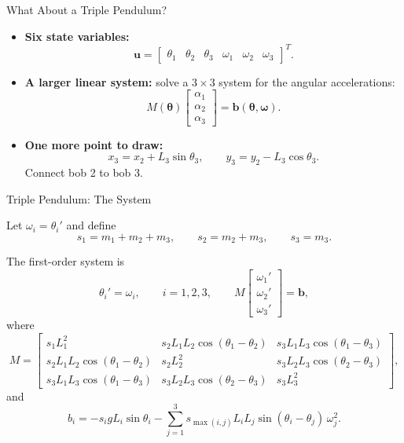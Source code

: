 \documentclass[10pt]{beamer}
\begin{document}
\begin{frame}{What About a Triple Pendulum?}


\begin{itemize}
    \item \textbf{Six state variables:}
    \[
    \mathbf{u}=
    \begin{bmatrix}
    \theta_1 & \theta_2 & \theta_3 &
    \omega_1 & \omega_2 & \omega_3
    \end{bmatrix}^{T}.
    \]

    \item \textbf{A larger linear system:}
    solve a $3\times3$ system for the angular accelerations:
    \[
    M(\boldsymbol{\theta})
    \begin{bmatrix}
    \alpha_1\\ \alpha_2\\ \alpha_3
    \end{bmatrix}
    =\mathbf{b}(\boldsymbol{\theta},\boldsymbol{\omega}).
    \]

    \item \textbf{One more point to draw:}
    \[
    x_3=x_2+L_3\sin\theta_3,
    \qquad
    y_3=y_2-L_3\cos\theta_3.
    \]
    Connect bob 2 to bob 3.
\end{itemize}


\end{frame}

\begin{frame}{Triple Pendulum: The System}

Let $\omega_i=\theta_i'$ and define
\[
s_1=m_1+m_2+m_3,\qquad s_2=m_2+m_3,\qquad s_3=m_3.
\]

The first-order system is
\[
\theta_i'=\omega_i,\qquad i=1,2,3,
\qquad
M
\begin{bmatrix}
\omega_1'\\ \omega_2'\\ \omega_3'
\end{bmatrix}
=\mathbf{b},
\]
where
{\small
\[
M=
\begin{bmatrix}
s_1L_1^2
& s_2L_1L_2\cos(\theta_1-\theta_2)
& s_3L_1L_3\cos(\theta_1-\theta_3)\\
s_2L_1L_2\cos(\theta_1-\theta_2)
& s_2L_2^2
& s_3L_2L_3\cos(\theta_2-\theta_3)\\
s_3L_1L_3\cos(\theta_1-\theta_3)
& s_3L_2L_3\cos(\theta_2-\theta_3)
& s_3L_3^2
\end{bmatrix},
\]
}
and
\[
b_i=-s_i gL_i\sin\theta_i
-\sum_{j=1}^{3}s_{\max(i,j)}L_iL_j
\sin(\theta_i-\theta_j)\,\omega_j^2.
\]


\end{frame}
\end{document}
